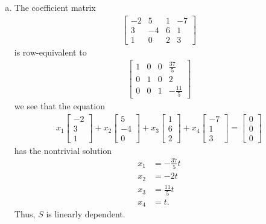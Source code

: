 \documentclass[12pt,letterpaper,reqno]{article}
\numberwithin{equation}{section}
\begin{document}
{\begin{solution}
\begin{enumerate}[(a)]
	\item The coefficient matrix
	\begin{align*}
		\begin{bmatrix}
			-2 & 5 & 1 & -7 \\
			3 & -4 & 6 & 1 \\
			1 & 0 & 2 & 3
		\end{bmatrix}
	\end{align*}
	is row-equivalent to
	\begin{align*}
		\begin{bmatrix}
			1 & 0 & 0 & \frac{37}{5} \\
			0 & 1 & 0 & 2 \\
			0 & 0 & 1 & -\frac{11}{5}
		\end{bmatrix}
	\end{align*}
	we see that the equation
	\begin{align*}
		x_1\begin{bmatrix}
			-2 \\3 \\ 1
		\end{bmatrix}+x_2\begin{bmatrix}
			5 \\-4 \\ 0
		\end{bmatrix}+x_3\begin{bmatrix}
			1 \\6 \\ 2
		\end{bmatrix}+x_4\begin{bmatrix}
			-7 \\1 \\ 3
		\end{bmatrix}=\begin{bmatrix}
			0 \\ 0 \\ 0
		\end{bmatrix}
	\end{align*}
	has the nontrivial solution
	\begin{align*}
		x_1&=-\frac{37}{5}t \\
		x_2&=-2t \\
		x_3&=\frac{11}{5}t \\
		x_4&=t.
	\end{align*}
	Thus, $S$ is linearly dependent.
\end{enumerate}
\end{solution}}
\end{document}
